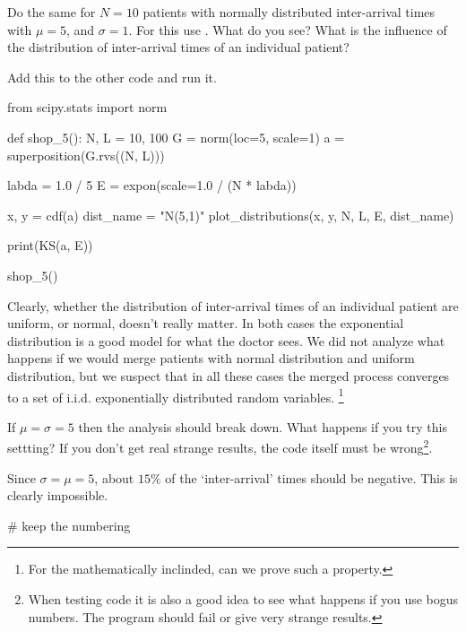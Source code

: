 \begin{exercise}
Do the same for $N=10$ patients with normally distributed inter-arrival times with $\mu=5$, and $\sigma =1$.
For this use . What do you see? What is the influence of the distribution of inter-arrival times of an individual patient?
\begin{solution}
Add this to the other code and run it.
\begin{pyverbatim}
from scipy.stats import norm

def shop_5():
    N, L = 10, 100
    G = norm(loc=5, scale=1)
    a = superposition(G.rvs((N, L)))

    labda = 1.0 / 5
    E = expon(scale=1.0 / (N * labda))

    x, y = cdf(a)
    dist_name = "N(5,1)"
    plot_distributions(x, y, N, L, E, dist_name)

    print(KS(a, E))

shop_5()
\end{pyverbatim}

Clearly, whether the distribution of inter-arrival times of an individual patient are uniform, or normal, doesn't really matter.
In both cases the exponential distribution is a good model for what the doctor sees.
We did not analyze what happens if we would merge patients with normal distribution and uniform distribution, but we suspect that in all these cases the merged process converges to a set of i.i.d.
exponentially distributed random variables.
\footnote{For the mathematically inclinded, can we prove such a property.}

\end{solution}
\end{exercise}

\begin{exercise}
  If $\mu=\sigma=5$ then the analysis should break down.
  What happens if you try this settting?
  If you don't get real strange results, the code itself must be wrong\footnote{When testing code it is also a good idea to see what happens if you use bogus numbers.
    The program should fail or give very strange results.}.
\begin{solution}
  Since $\sigma=\mu=5$, about $15\%$ of the `inter-arrival' times should be negative. This is clearly impossible.
\begin{pyverbatim}
# keep the numbering
\end{pyverbatim}
\end{solution}
\end{exercise}



